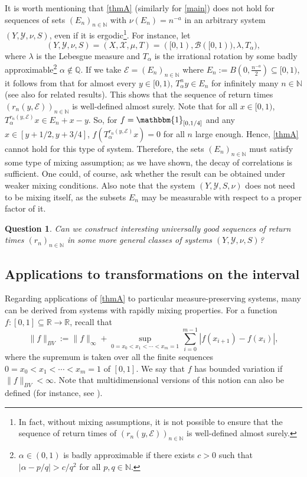 \documentclass[11pt]{amsart}
\numberwithin{equation}{section}
\newtheorem{question}{Question}
\theoremstyle{definition}
\theoremstyle{plain}
\newcommand{\N}{{\mathbb N}}
\newcommand{\R}{{\mathbb R}}
\begin{document}
   It is worth mentioning that \cref{thmA} (similarly for \cref{main}) does not hold for sequences of sets $(E_n)_{n\in\N}$ with $\nu(E_n)=n^{-a}$ in an arbitrary system $(Y,\mathcal{Y},\nu,S)$, even if it is ergodic\footnote{In fact, without mixing assumptions, it is not possible to ensure that the sequence of return times of $(r_n(y,\mathcal{E}))_{n\in\N}$ is well-defined almost surely.}. For instance, let $$(Y,\mathcal{Y},\nu,S)=(X,\mathcal{X},\mu,T)=([0,1),\mathcal{B}([0,1)),\lambda,T_\alpha),$$ where $\lambda$ is the Lebesgue measure and $T_\alpha$ is the irrational rotation by some badly approximable\footnote{$\alpha\in (0,1)$ is badly approximable if there exists $c>0$ such that $|\alpha-p/q|>c/q^2$ for all $p,q\in \N$.} $\alpha\notin \mathbb{Q}$. If we take $\mathcal{E}=(E_n)_{n\in\N}$ where $E_n:=B(0,\frac{n^{-a}}{2})\subseteq [0,1)$, it follows from \cite[Theorem 1.2]{Chaika_Constantine} that for almost every $y\in [0,1)$, $T_\alpha^ny\in E_n$ for infinitely many $n\in \N$ (see also \cite{Fayad,Kim_Rotations,Kurzweil} for related results). This shows that the sequence of return times $(r_n(y,\mathcal{E}))_{n\in\N}$ is well-defined almost surely. Note that for all $x\in [0,1)$, $T_\alpha^{r_n(y,\mathcal{E})}x \in E_n + x-y$. So, for $f=\mathbbm{1}_{[0,1/4]}$ and any $x\in [y+1/2,y+3/4]$, $f(T_\alpha^{r_n(y,\mathcal{E})}x)=0$ for all $n$ large enough. Hence, \cref{thmA} cannot hold for this type of system. Therefore, the sets $(E_n)_{n\in \N}$ must satisfy some type of mixing assumption; as we have shown, the decay of correlations is sufficient. One could, of course, ask whether the result can be obtained under weaker mixing conditions.  Also note that the system $(Y,\mathcal{Y},S,\nu)$ does not need to be mixing itself, as the subsets $E_n$ may be measurable with respect to a proper factor of it.

\begin{question}
    Can we construct interesting universally good sequences of return times $(r_n)_{n\in\N}$ in some more general classes of systems $(Y,\mathcal{Y},\nu,S)$? 
\end{question}

\subsection{Applications to transformations on the interval}
Regarding applications of \cref{thmA} to particular measure-preserving systems, many can be derived from systems with rapidly mixing properties. For a function $f\colon [0,1]\subseteq \R\to \R$, recall that 
 $$\|f\|_{BV}:=\displaystyle \|f\|_{\infty}+\sup_{0=x_0<x_1<\cdots<x_m=1}\sum_{i=0}^{m-1}|f(x_{i+1})-f(x_i)|,$$ where the supremum is taken over all the finite sequences $0=x_0<x_1<\cdots<x_m=1$ of $[0,1]$. We say that $f$ has bounded variation if $\|f\|_{BV}<\infty$.  Note that multidimensional versions of this notion can also be defined (for instance, see \cite{Liverani_Multimensional}).
\end{document}
